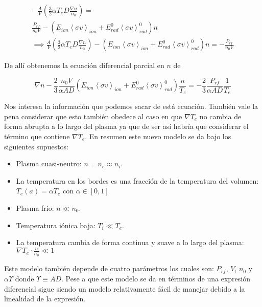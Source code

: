 \documentclass[11pt]{article}
\theoremstyle{definition}
\begin{document}
  \begin{eqnarray*}
    -\frac{A}{V}\left(\frac{3}{2}\alpha T_e D\frac{\nabla n}{n_0}\right) = \\ \frac{P_{rf}}{n_0V} - \left(E_{ion}\left<\sigma v\right>_{ion} + E_{rad}^0\left<\sigma v\right>_{rad}^{0}\right)n \\
    \implies \frac{A}{V}\left(\frac{3}{2}\alpha T_e D\frac{\nabla n}{n_0}\right) - \left(E_{ion}\left<\sigma v\right>_{ion} + E_{rad}^0\left<\sigma v\right>_{rad}^{0  }\right)n = -\frac{P_{rf}}{n_0V}
    \end{eqnarray*}
 
    De all\'i obtenemos la ecuaci\'on diferencial parcial en $n$ de 

    \begin{equation}
      \nabla n - \frac{2}{3}\frac{n_0 V}{\alpha AD}\left(  E_{ion}\left<\sigma v\right>_{ion} + E_{rad}^0\left<\sigma v\right>_{rad}^0\right)\frac{n}{T_e} = - \frac{2}{3}\frac{P_{rf}}{\alpha AD}\frac{1}{T_e}
    \end{equation}

  Nos interesa la informaci\'on que podemos sacar de est\'a ecuaci\'on. Tambi\'en vale la pena considerar que esto tambi\'en obedece al caso en que $\nabla T_e$ no cambia de forma abrupta a lo largo del plasma ya que de ser as\'i habr\'ia que considerar el t\'ermino que contiene $\nabla T_e$. En resumen este nuevo modelo se da bajo los siguientes supuestos:

  \begin{itemize}
    \item Plasma cuasi-neutro: $n = n_e \approx n_i$.
    \item La temperatura en los bordes es una fracci\'on de la temperatura del volumen: $T_e(a) = \alpha T_e$ con $\alpha \in [0,1]$
    \item Plasma fr\'io: $n \ll n_0$.
    \item Temperatura i\'onica baja: $T_i \ll T_e$.
    \item La temperatura cambia de forma continua y suave a lo largo del plasma: $\nabla T_e \cdot \frac{n}{n_0} \ll 1$
  \end{itemize}

  Este modelo tambi\'en depende de cuatro par\'ametros los cuales son: $P_{rf}$, $V$, $n_0$ y $\alpha\varUpsilon$ donde $\varUpsilon \equiv A D$. Pese a que este modelo se da en t\'erminos de una expresi\'on diferencial sigue siendo un modelo relativamente f\'acil de manejar debido a la linealidad de la expresi\'on. 
\end{document}
